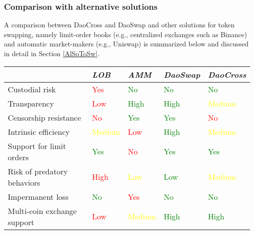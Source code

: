 \documentclass[11pt, reqno]{amsart}
\theoremstyle{definition}
\theoremstyle{remark}
\begin{document}
\subsubsection{Comparison with alternative solutions}
A comparison between DaoCross and DaoSwap and other solutions for token
swapping, namely limit-order books (e.g., centralized exchanges such as
Binance) and automatic market-makers (e.g., Uniswap) is summarized below
and discussed in detail in Section \ref{AlSoToSw}.

\begin{samepage}
	\begin{table}[h!]
		\centering
		\begin{tabular}{lllll}
			                            & \emph{LOB} & \emph{AMM} & \emph{DaoSwap} & \emph{DaoCross} \\
			\hline
            Custodial risk              & \textcolor{red}{Yes}        & \textcolor{green}{No} & \textcolor{green}{No} & \textcolor{green}{No}  \\
            Transparency                & \textcolor{red}{Low}        & \textcolor{green}{High}       & \textcolor{green}{High}           & \textcolor{yellow}{Medium} \\
            Censorship resistance       & \textcolor{red}{No}         & \textcolor{green}{Yes} & \textcolor{green}{Yes} & \textcolor{red}{No} \\
            Intrinsic efficiency        & \textcolor{yellow}{Medium}     & \textcolor{red}{Low}        & \textcolor{green}{High} & \textcolor{yellow}{Medium}          \\
            Support for limit orders    & \textcolor{green}{Yes} & \textcolor{red}{No} & \textcolor{green}{Yes}            & \textcolor{green}{Yes} \\
            Risk of predatory behaviors & \textcolor{red}{High} & \textcolor{yellow}{Low} & \textcolor{green}{Low}       & \textcolor{yellow}{Medium} \\
            Impermanent loss            & \textcolor{green}{No}         & \textcolor{red}{Yes} & \textcolor{green}{No}             & \textcolor{green}{No}              \\
            Multi-coin exchange support & \textcolor{red}{Low} & \textcolor{yellow}{Medium} & \textcolor{green}{High} & \textcolor{green}{High} \\
			\hline
		\end{tabular}
	\end{table}
\end{samepage}
\end{document}
